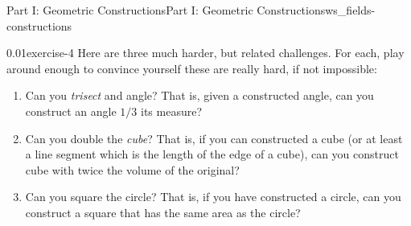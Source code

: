 \documentclass[oneside,11pt,]{article}
\begin{document}
\begin{worksheet-section-numberless}{Part I: Geometric Constructions}{}{Part I: Geometric Constructions}{}{}{ws_fields-constructions}
\begin{divisionexercise}{4}{}{0.01}{exercise-4}%
\hypertarget{p-13}{}%
Here are three much harder, but related challenges.  For each, play around enough to convince yourself these are really hard, if not impossible:\leavevmode%
\begin{enumerate}[label=(\alph*)]
\item\hypertarget{li-1}{}\hypertarget{p-14}{}%
Can you \emph{trisect} and angle?  That is, given a constructed angle, can you construct an angle \(1/3\) its measure?%
\item\hypertarget{li-2}{}\hypertarget{p-15}{}%
Can you double the \emph{cube}?  That is, if you can constructed a cube (or at least a line segment which is the length of the edge of a cube), can you construct cube with twice the volume of the original?%
\item\hypertarget{li-3}{}\hypertarget{p-16}{}%
Can you square the circle?  That is, if you have constructed a circle, can you construct a square that has the same area as the circle?%
\end{enumerate}
%
\end{divisionexercise}%
\end{worksheet-section-numberless}
\restoregeometry
%
%
\typeout{************************************************}
\typeout{************************************************}
%
\end{document}
